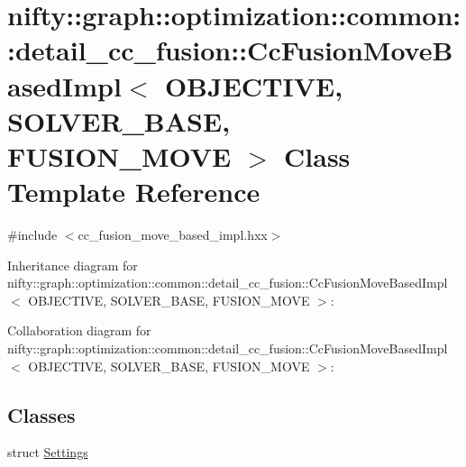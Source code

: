 \hypertarget{classnifty_1_1graph_1_1optimization_1_1common_1_1detail__cc__fusion_1_1CcFusionMoveBasedImpl}{}\section{nifty\+:\+:graph\+:\+:optimization\+:\+:common\+:\+:detail\+\_\+cc\+\_\+fusion\+:\+:Cc\+Fusion\+Move\+Based\+Impl$<$ O\+B\+J\+E\+C\+T\+I\+V\+E, S\+O\+L\+V\+E\+R\+\_\+\+B\+A\+S\+E, F\+U\+S\+I\+O\+N\+\_\+\+M\+O\+V\+E $>$ Class Template Reference}
\label{classnifty_1_1graph_1_1optimization_1_1common_1_1detail__cc__fusion_1_1CcFusionMoveBasedImpl}


{\ttfamily \#include $<$cc\+\_\+fusion\+\_\+move\+\_\+based\+\_\+impl.\+hxx$>$}



Inheritance diagram for nifty\+:\+:graph\+:\+:optimization\+:\+:common\+:\+:detail\+\_\+cc\+\_\+fusion\+:\+:Cc\+Fusion\+Move\+Based\+Impl$<$ O\+B\+J\+E\+C\+T\+I\+V\+E, S\+O\+L\+V\+E\+R\+\_\+\+B\+A\+S\+E, F\+U\+S\+I\+O\+N\+\_\+\+M\+O\+V\+E $>$\+:


Collaboration diagram for nifty\+:\+:graph\+:\+:optimization\+:\+:common\+:\+:detail\+\_\+cc\+\_\+fusion\+:\+:Cc\+Fusion\+Move\+Based\+Impl$<$ O\+B\+J\+E\+C\+T\+I\+V\+E, S\+O\+L\+V\+E\+R\+\_\+\+B\+A\+S\+E, F\+U\+S\+I\+O\+N\+\_\+\+M\+O\+V\+E $>$\+:
\subsection*{Classes}
\begin{DoxyCompactItemize}
\item 
struct \hyperlink{structnifty_1_1graph_1_1optimization_1_1common_1_1detail__cc__fusion_1_1CcFusionMoveBasedImpl_1_1Settings}{Settings}
\end{DoxyCompactItemize}
